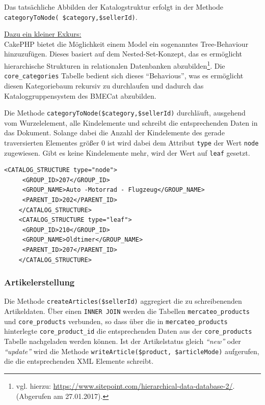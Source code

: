 	 Das tatsächliche Abbilden der Katalogstruktur erfolgt in der Methode \texttt{categoryToNode(\ \$category,\$sellerId)}.
	 
	\begin{addmargin}[1cm]{1cm}
	\underline{Dazu ein kleiner Exkurs:}\\
		 CakePHP bietet die Möglichkeit einem Model ein sogenanntes Tree-Behaviour hinzuzufügen. Dieses basiert auf dem Nested-Set-Konzept, das es ermöglicht hierarchische Strukturen in relationalen Datenbanken abzubilden\footnote{vgl. hierzu: \url{https://www.sitepoint.com/hierarchical-data-database-2/}.(Abgerufen am 27.01.2017).}. Die \texttt{core\_categories} Tabelle bedient sich dieses \enquote{Behavious}, was es ermöglicht diesen Kategoriebaum rekursiv zu durchlaufen und dadurch das Kataloggruppensystem des BMECat abzubilden.
	\end{addmargin}
	
	
	Die Methode \texttt{categoryToNode(\$category,\$sellerId)} durchläuft, ausgehend vom Wurzelelement, alle Kindelemente und schreibt die entsprechenden Daten in das Dokument. Solange dabei die Anzahl der Kindelemente des gerade traversierten Elementes größer 0 ist wird dabei dem Attribut \texttt{type} der Wert \texttt{node} zugewiesen. Gibt es keine Kindelemente mehr, wird der Wert auf \texttt{leaf} gesetzt. 
	\lstset{language=xml}
	\begin{lstlisting}[caption={Abbildung der Kataloggruppensystems}]
	<CATALOG_STRUCTURE type="node">
	 <GROUP_ID>207</GROUP_ID>
	 <GROUP_NAME>Auto -Motorrad - Flugzeug</GROUP_NAME>
	 <PARENT_ID>202</PARENT_ID>
	</CATALOG_STRUCTURE>
	<CATALOG_STRUCTURE type="leaf">
	 <GROUP_ID>210</GROUP_ID>
	 <GROUP_NAME>Oldtimer</GROUP_NAME>
	 <PARENT_ID>207</PARENT_ID>
	</CATALOG_STRUCTURE>
	\end{lstlisting}
	
	\subsubsection{Artikelerstellung}
	
	Die Methode \texttt{createArticles(\$sellerId)} aggregiert die zu schreibenenden Artikeldaten. Über einen \texttt{INNER JOIN} werden die Tabellen \texttt{mercateo\_products} und \texttt{core\_products} verbunden, so dass über die in \texttt{mercateo\_products} hinterlegte \texttt{core\_product\_id} die entsprechenden Daten aus der \texttt{core\_products} Tabelle nachgeladen werden können. 
	Ist der Artikelstatus gleich \textit{\enquote{new}} oder \textit{\enquote{update}} wird die Methode \texttt{writeArticle(\$product, \$articleMode)} aufgerufen, die die entsprechenden XML Elemente schreibt. \\
		
